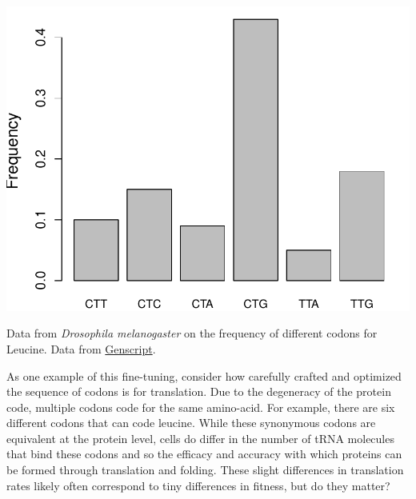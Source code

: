 {\begin{marginfigure}
\begin{center}
\includegraphics[width=\textwidth]{Journal_figs/drift_selection/Codon_bias_Drosophila/Leucine_codon_bias.pdf}
\end{center}
\caption{Data from {\it Drosophila melanogaster} on the frequency of
  different codons for Leucine. Data from \href{https://www.genscript.com/tools/codon-frequency-table}{Genscript}. } \label{fig:Leucine}
\end{marginfigure}
As one example of this fine-tuning, consider how carefully crafted and optimized the sequence of codons is for translation. Due to the degeneracy of the protein code, multiple codons code for the same
amino-acid. For example, there are six different codons that can code
leucine. While these synonymous codons are equivalent at the protein
level, cells do differ in the number of tRNA molecules that bind
these codons and so the efficacy and accuracy with which proteins can be formed through
translation and folding.  These slight differences in translation rates
likely often correspond to tiny differences in fitness, but do they
matter?

}
